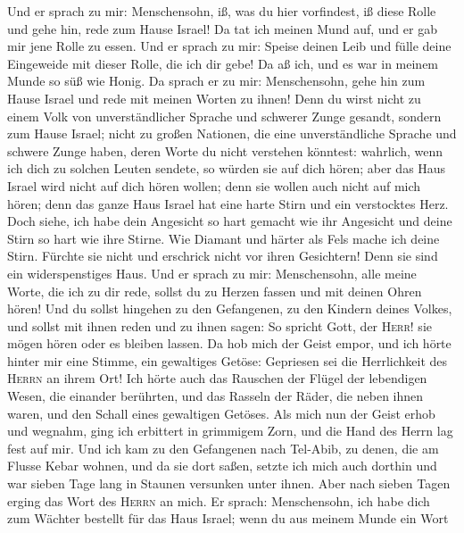  Und er sprach zu mir: Menschensohn, iß, was du hier
vorfindest, iß diese Rolle und gehe hin, rede zum Hause Israel!
 Da tat ich meinen Mund auf, und er gab mir jene Rolle zu
essen.  Und er sprach zu mir: Speise deinen Leib und fülle
deine Eingeweide mit dieser Rolle, die ich dir gebe! Da aß ich, und es
war in meinem Munde so süß wie Honig.  Da sprach er zu
mir: Menschensohn, gehe hin zum Hause Israel und rede mit meinen Worten
zu ihnen!  Denn du wirst nicht zu einem Volk von
unverständlicher Sprache und schwerer Zunge gesandt, sondern zum Hause
Israel;  nicht zu großen Nationen, die eine
unverständliche Sprache und schwere Zunge haben, deren Worte du nicht
verstehen könntest: wahrlich, wenn ich dich zu solchen Leuten sendete,
so würden sie auf dich hören;  aber das Haus Israel wird
nicht auf dich hören wollen; denn sie wollen auch nicht auf mich hören;
denn das ganze Haus Israel hat eine harte Stirn und ein verstocktes
Herz.  Doch siehe, ich habe dein Angesicht so hart gemacht
wie ihr Angesicht und deine Stirn so hart wie ihre Stirne.
 Wie Diamant und härter als Fels mache ich deine Stirn.
Fürchte sie nicht und erschrick nicht vor ihren Gesichtern! Denn sie
sind ein widerspenstiges Haus.  Und er sprach zu mir:
Menschensohn, alle meine Worte, die ich zu dir rede, sollst du zu Herzen
fassen und mit deinen Ohren hören!  Und du sollst
hingehen zu den Gefangenen, zu den Kindern deines Volkes, und sollst mit
ihnen reden und zu ihnen sagen: So spricht Gott, der \textsc{Herr}! sie
mögen hören oder es bleiben lassen.  Da hob mich der
Geist empor, und ich hörte hinter mir eine Stimme, ein gewaltiges
Getöse: Gepriesen sei die Herrlichkeit des \textsc{Herrn} an ihrem Ort!
 Ich hörte auch das Rauschen der Flügel der lebendigen
Wesen, die einander berührten, und das Rasseln der Räder, die neben
ihnen waren, und den Schall eines gewaltigen Getöses. 
Als mich nun der Geist erhob und wegnahm, ging ich erbittert in
grimmigem Zorn, und die Hand des Herrn lag fest auf mir. 
Und ich kam zu den Gefangenen nach Tel-Abib, zu denen, die am Flusse
Kebar wohnen, und da sie dort saßen, setzte ich mich auch dorthin und
war sieben Tage lang in Staunen versunken unter ihnen. 
Aber nach sieben Tagen erging das Wort des \textsc{Herrn} an mich.
 Er sprach: Menschensohn, ich habe dich zum Wächter
bestellt für das Haus Israel; wenn du aus meinem Munde ein Wort
